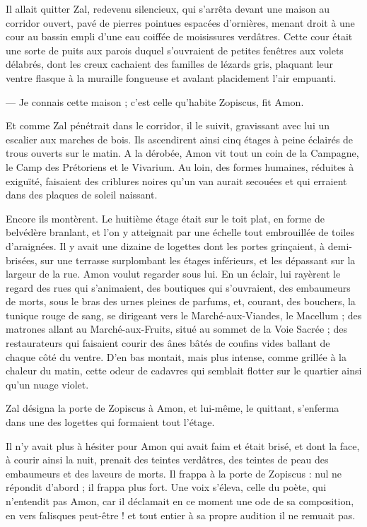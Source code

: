 \documentclass[a4paper, 11pt, oneside, polutonikogreek, french]{article}
\begin{document}
Il allait quitter Zal, redevenu silencieux, qui s'arrêta devant une maison au corridor ouvert, pavé de pierres pointues espacées d'ornières, menant droit à une cour au bassin empli d'une eau coiffée de moisissures verdâtres. Cette cour était une sorte de puits aux parois duquel s'ouvraient de petites fenêtres aux volets délabrés, dont les creux cachaient des familles de lézards gris, plaquant leur ventre flasque à la muraille fongueuse et avalant placidement l'air empuanti.

--- Je connais cette maison ; c'est celle qu'habite Zopiscus, fit Amon.

Et comme Zal pénétrait dans le corridor, il le suivit, gravissant avec lui un escalier aux marches de bois. Ils ascendirent ainsi cinq étages à peine éclairés de trous ouverts sur le matin. A la dérobée, Amon vit tout un coin de la Campagne, le Camp des Prétoriens et le Vivarium. Au loin, des formes humaines, réduites à exiguïté, faisaient des criblures noires qu'un van aurait secouées et qui erraient dans des plaques de soleil naissant.

Encore ils montèrent. Le huitième étage était sur le toit plat, en forme de belvédère branlant, et l'on y atteignait par une échelle tout embrouillée de toiles d'araignées. Il y avait une dizaine de logettes dont les portes grinçaient, à demi-brisées, sur une terrasse surplombant les étages inférieurs, et les dépassant sur la largeur de la rue. Amon voulut regarder sous lui. En un éclair, lui rayèrent le regard des rues qui s'animaient, des boutiques qui s'ouvraient, des embaumeurs de morts, sous le bras des urnes pleines de parfums, et, courant, des bouchers, la tunique rouge de sang, se dirigeant vers le Marché-aux-Viandes, le Macellum ; des matrones allant au Marché-aux-Fruits, situé au sommet de la Voie Sacrée ; des restaurateurs qui faisaient courir des ânes bâtés de coufins vides ballant de chaque côté du ventre. D'en bas montait, mais plus intense, comme grillée à la chaleur du matin, cette odeur de cadavres qui semblait flotter sur le quartier ainsi qu'un nuage violet.

Zal désigna la porte de Zopiscus à Amon, et lui-même, le quittant, s'enferma dans une des logettes qui formaient tout l'étage.

Il n'y avait plus à hésiter pour Amon qui avait faim et était brisé, et dont la face, à courir ainsi la nuit, prenait des teintes verdâtres, des teintes de peau des embaumeurs et des laveurs de morts. Il frappa à la porte de Zopiscus : nul ne répondit d'abord ; il frappa plus fort. Une voix s'éleva, celle du poète, qui n'entendit pas Amon, car il déclamait en ce moment une ode de sa composition, en vers falisques peut-être ! et tout entier à sa propre audition il ne remuait pas.
\end{document}
